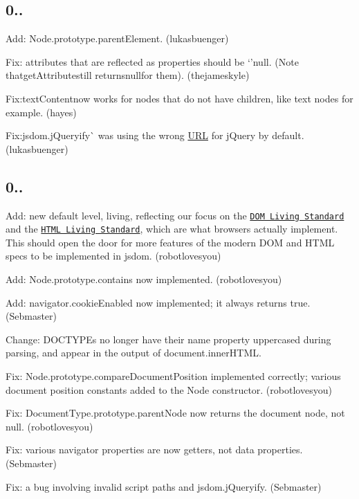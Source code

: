 \subsection*{0..}


\begin{DoxyItemize}
\item Add\+: {\ttfamily Node.\+prototype.\+parent\+Element}. (lukasbuenger)
\item Fix\+: attributes that are reflected as properties should be `'null{\ttfamily . (Note that}get\+Attribute{\ttfamily still returns}null{\ttfamily for them). (thejameskyle)}
\item {\ttfamily Fix\+:}text\+Content{\ttfamily now works for nodes that do not have children, like text nodes for example. (hayes)}
\item {\ttfamily Fix\+:}jsdom.\+j\+Queryify\`{} was using the wrong \mbox{\hyperlink{namespace_u_r_l}{U\+RL}} for j\+Query by default. (lukasbuenger)
\end{DoxyItemize}

\subsection*{0..}


\begin{DoxyItemize}
\item Add\+: new default level, {\ttfamily living}, reflecting our focus on the \href{http://dom.spec.whatwg.org/}{\tt D\+OM Living Standard} and the \href{http://www.whatwg.org/specs/web-apps/current-work/multipage/}{\tt H\+T\+ML Living Standard}, which are what browsers actually implement. This should open the door for more features of the modern D\+OM and H\+T\+ML specs to be implemented in jsdom. (robotlovesyou)
\item Add\+: {\ttfamily Node.\+prototype.\+contains} now implemented. (robotlovesyou)
\item Add\+: {\ttfamily navigator.\+cookie\+Enabled} now implemented; it always returns {\ttfamily true}. (Sebmaster)
\item Change\+: D\+O\+C\+T\+Y\+P\+Es no longer have their {\ttfamily name} property uppercased during parsing, and appear in the output of {\ttfamily document.\+inner\+H\+T\+ML}.
\item Fix\+: {\ttfamily Node.\+prototype.\+compare\+Document\+Position} implemented correctly; various document position constants added to the {\ttfamily Node} constructor. (robotlovesyou)
\item Fix\+: {\ttfamily Document\+Type.\+prototype.\+parent\+Node} now returns the document node, not {\ttfamily null}. (robotlovesyou)
\item Fix\+: various {\ttfamily navigator} properties are now getters, not data properties. (Sebmaster)
\item Fix\+: a bug involving invalid script paths and {\ttfamily jsdom.\+j\+Queryify}. (Sebmaster)
\end{DoxyItemize}

